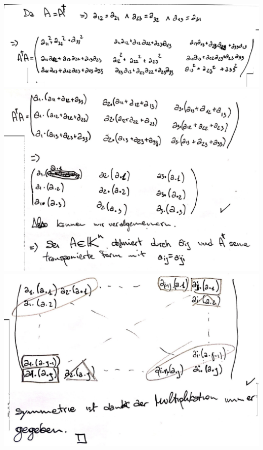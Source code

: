\documentclass[10pt,a4paper]{article}
\begin{document}
\includegraphics[scale=0.15]{lat3_4_2.jpg} 
\includegraphics[scale=0.15]{lat3_4_3.jpg} 
\newpage
\includegraphics[scale=0.15]{lat3_4_4.jpg} 
\end{document}

